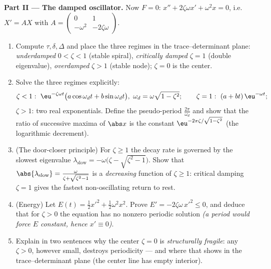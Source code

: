 \begin{problem}
\medskip
\noindent\textbf{Part II --- The damped oscillator.} Now $F =
0$: $x'' + 2\zeta\omega x' + \omega^2x = 0$, i.e.\ $X' = AX$
with $A = \begin{pmatrix} 0 & 1\\ -\omega^2 &
-2\zeta\omega\end{pmatrix}$.
\begin{enumerate}[resume]
  \item Compute $\tau, \delta, \Delta$ and place the three
        regimes in the trace--determinant plane:
        \emph{underdamped} $0 < \zeta < 1$ (stable spiral),
        \emph{critically damped} $\zeta = 1$ (double
        eigenvalue), \emph{overdamped} $\zeta > 1$ (stable
        node); $\zeta = 0$ is the center.
  \item Solve the three regimes explicitly:
        \[
        \zeta < 1:\ \eu^{-\zeta\omega t}\bigl(a\cos\omega_d t
        + b\sin\omega_dt\bigr),\ \omega_d =
        \omega\sqrt{1-\zeta^2};
        \qquad
        \zeta = 1:\ (a + bt)\,\eu^{-\omega t};
        \]
        $\zeta > 1$: two real exponentials. Define the
        pseudo-period $\frac{2\pi}{\omega_d}$ and show that
        the ratio of successive maxima of $\abs x$ is the
        constant $\eu^{-2\pi\zeta/\sqrt{1-\zeta^2}}$ (the
        logarithmic decrement).
  \item (The door-closer principle) For $\zeta \geq 1$ the
        decay rate is governed by the slowest eigenvalue
        $\lambda_{\mathrm{slow}} = -\omega\bigl(\zeta -
        \sqrt{\zeta^2-1}\bigr)$. Show that
        $\abs{\lambda_{\mathrm{slow}}} =
        \frac{\omega}{\zeta + \sqrt{\zeta^2 - 1}}$ is a
        \emph{decreasing} function of $\zeta \geq 1$:
        critical damping $\zeta = 1$ gives the fastest
        non-oscillating return to rest.
  \item (Energy) Let $E(t) = \frac12x'^2 +
        \frac12\omega^2x^2$. Prove $E' = -2\zeta\omega\,x'^2
        \leq 0$, and deduce that for $\zeta > 0$ the equation
        has no nonzero periodic solution \emph{(a period would
        force $E$ constant, hence $x' \equiv 0$)}.
  \item Explain in two sentences why the center $\zeta = 0$
        is \emph{structurally fragile}: any $\zeta > 0$,
        however small, destroys periodicity --- and where
        that shows in the trace--determinant plane (the
        center line has empty interior).
\end{enumerate}


\end{problem}
